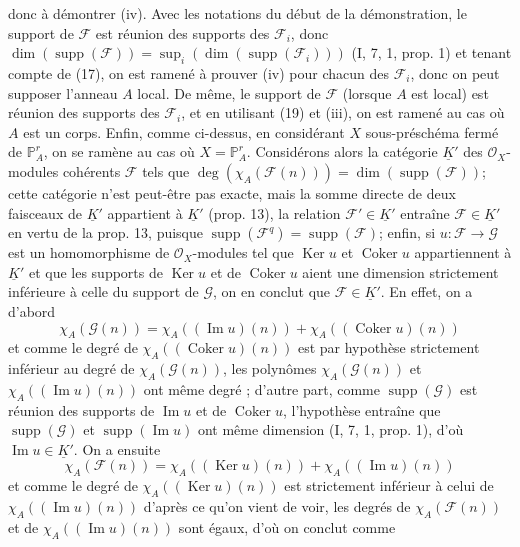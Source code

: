 donc à démontrer (iv). Avec les notations du début de la démonstration, le support de $\mathcal{F}$ est réunion des supports des $\mathcal{F}_i$, donc $\dim(\operatorname{supp}(\mathcal{F})) = \sup_i(\dim(\operatorname{supp}(\mathcal{F}_i)))$ (I, 7, 1, prop. 1) et tenant compte de (17), on est ramené à prouver (iv) pour chacun des $\mathcal{F}_i$, donc on peut supposer l'anneau $A$ local. De même, le support de $\mathcal{F}$ (lorsque $A$ est local) est réunion des supports des $\mathcal{F}_i$, et en utilisant (19) et (iii), on est ramené au cas où $A$ est un corps. Enfin, comme ci-dessus, en considérant $X$ sous-préschéma fermé de $\mathbb{P}^r_A$, on se ramène au cas où $X = \mathbb{P}^r_A$. Considérons alors la catégorie $\underline{K}'$ des $\mathcal{O}_X$-modules cohérents $\mathcal{F}$ tels que $\deg(\chi_A(\mathcal{F}(n))) = \dim(\operatorname{supp}(\mathcal{F}))$; cette catégorie n'est peut-être pas exacte, mais la somme directe de deux faisceaux de $\underline{K}'$ appartient à $\underline{K}'$ (prop. 13), la relation $\mathcal{F}' \in \underline{K}'$ entraîne $\mathcal{F} \in \underline{K}'$ en vertu de la prop. 13, puisque $\operatorname{supp}(\mathcal{F}^q) = \operatorname{supp}(\mathcal{F})$; enfin, si $u : \mathcal{F} \to \mathcal{G}$ est un homomorphisme de $\mathcal{O}_X$-modules tel que $\operatorname{Ker} u$ et $\operatorname{Coker} u$ appartiennent à $\underline{K}'$ et que les supports de $\operatorname{Ker} u$ et de $\operatorname{Coker} u$ aient une dimension strictement inférieure à celle du support de $\mathcal{G}$, on en conclut que $\mathcal{F} \in \underline{K}'$. En effet, on a d'abord
$$\chi_A(\mathcal{G}(n)) = \chi_A((\operatorname{Im} u)(n)) + \chi_A((\operatorname{Coker} u)(n))$$
et comme le degré de $\chi_A((\operatorname{Coker} u)(n))$ est par hypothèse strictement inférieur au degré de $\chi_A(\mathcal{G}(n))$, les polynômes $\chi_A(\mathcal{G}(n))$ et $\chi_A((\operatorname{Im} u)(n))$ ont même degré ; d'autre part, comme $\operatorname{supp}(\mathcal{G})$ est réunion des supports de $\operatorname{Im} u$ et de $\operatorname{Coker} u$, l'hypothèse entraîne que $\operatorname{supp}(\mathcal{G})$ et $\operatorname{supp}(\operatorname{Im} u)$ ont même dimension (I, 7, 1, prop. 1), d'où $\operatorname{Im} u \in \underline{K}'$. On a ensuite
$$\chi_A(\mathcal{F}(n)) = \chi_A((\operatorname{Ker} u)(n)) + \chi_A((\operatorname{Im} u)(n))$$
et comme le degré de $\chi_A((\operatorname{Ker} u)(n))$ est strictement inférieur à celui de $\chi_A((\operatorname{Im} u)(n))$ d'après ce qu'on vient de voir, les degrés de $\chi_A(\mathcal{F}(n))$ et de $\chi_A((\operatorname{Im} u)(n))$ sont égaux, d'où on conclut comme


